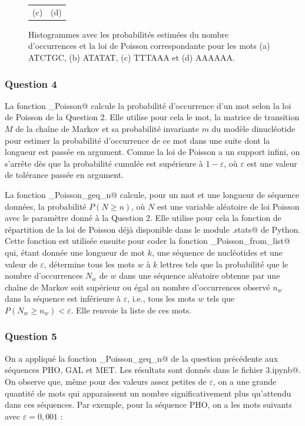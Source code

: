 \documentclass[a4paper,12pt]{article}
\begin{document}
\begin{figure}
\begin{tabular}{@{} c @{} c @{}}
(c) & (d) \tabularnewline
\end{tabular}
\caption{Histogrammes avec les probabilités estimées du nombre d'occurrences et la loi de Poisson correspondante pour les mots (a) ATCTGC, (b) ATATAT, (c) TTTAAA et (d) AAAAAA.}
\label{FigHistogrammesPoisson}
\end{figure}

\subsubsection*{Question 4}

La fonction \verb@proba_Poisson@ calcule la probabilité d'occurrence d'un mot selon la loi de Poisson de la Question 2. Elle utilise pour cela le mot, la matrice de transition $M$ de la chaîne de Markov et sa probabilité invariante $m$ du modèle dinucléotide pour estimer la probabilité d'occurrence de ce mot dans une suite dont la longueur est passée en argument. Comme la loi de Poisson a un support infini, on s'arrête dès que la probabilité cumulée est supérieure à $1 - \varepsilon$, où $\varepsilon$ est une valeur de tolérance passée en argument.

La fonction \verb@proba_Poisson_geq_n@ calcule, pour un mot et une longueur de séquence données, la probabilité $P(N \geq n)$, où $N$ est une variable aléatoire de loi Poisson avec le paramètre donné à la Question 2. Elle utilise pour cela la fonction de répartition de la loi de Poisson déjà disponible dans le module \verb@scipy.stats@ de Python. Cette fonction est utilisée ensuite pour coder la fonction \verb@proba_Poisson_from_list@ qui, étant donnée une longueur de mot $k$, une séquence de nucléotides et une valeur de $\varepsilon$, détermine tous les mots $w$ à $k$ lettres tels que la probabilité que le nombre d'occurrences $N_w$ de $w$ dans une séquence aléatoire obtenue par une chaîne de Markov soit supérieur ou égal au nombre d'occurrences observé $n_w$ dans la séquence est inférieure à $\varepsilon$, i.e., tous les mots $w$ tels que $P(N_w \geq n_w) < \varepsilon$. Elle renvoie la liste de ces mots.

\subsubsection*{Question 5}

On a appliqué la fonction \verb@proba_Poisson_geq_n@ de la question précédente aux séquences PHO, GAL et MET. Les résultats sont donnés dans le fichier \verb@Projet3.ipynb@. On observe que, même pour des valeurs assez petites de $\varepsilon$, on a une grande quantité de mots qui apparaissent un nombre significativement plus qu'attendu dans ces séquences. Par exemple, pour la séquence PHO, on a les mots suivants avec $\varepsilon = 0,001$ :
\end{document}
